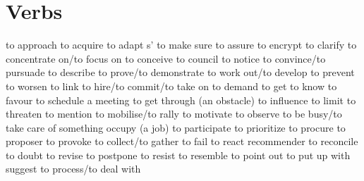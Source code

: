 \section{Verbs}
   {to approach}
   {to acquire}
   {to adapt}
 {s'}   {to make sure}
   {to assure}
   {to encrypt}
   {to clarify}
   {to concentrate on/to focus on}
   {to conceive}
   {to council}
   {to notice}
   {to convince/to pursuade}
   {to describe}
   {to prove/to demonstrate}
   {to work out/to develop}
   {to prevent}
   {to worsen}
   {to link}
   {to hire/to commit/to take on}
   {to demand}
   {to get to know}
   {to favour}
   {to schedule a meeting}
   {to get through (an obstacle)}
   {to influence}
   {to limit}
   {to threaten}
   {to mention}
   {to mobilise/to rally}
   {to motivate}
   {to observe}
   {to be busy/to take care of something}
   {occupy (a job)}
   {to participate}
   {to prioritize}
   {to procure}
   {to proposer}
   {to provoke}
   {to collect/to gather}
   {to fail}
   {to react}
   {recommender}
   {to reconcile}
   {to doubt}
   {to revise}
   {to postpone}
   {to resist}
   {to resemble}
   {to point out}
   {to put up with}
   {suggest}
   {to process/to deal with}
